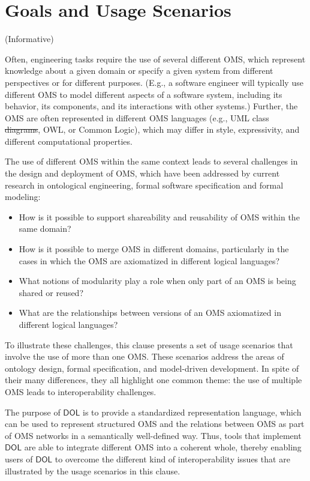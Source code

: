 \documentclass[10pt,fleqn,final]{scrreprt}
\newcommand*{\DOL}{\ensuremath{\mathsf{DOL}}\xspace}
\newcommand{\informative}[0]{{\begin{center}{\Large{(Informative})}\end{center}} \bigskip}
\newcommand{\clauseI}[1]{\chapter{#1} \informative }
\newenvironment{definitions}[0]{\medskip }{}
\providecommand{\DIFadd}[1]{{\protect\color{blue}\uwave{#1}}} %
\providecommand{\DIFdel}[1]{{\protect\color{red}\sout{#1}}}                      %
\providecommand{\DIFaddbegin}{} %
\providecommand{\DIFaddend}{} %
\providecommand{\DIFdelbegin}{} %
\providecommand{\DIFdelend}{} %
\begin{document}
\begin{definitions}

\clauseI{Goals and Usage Scenarios} \label{c:goal}


Often, engineering tasks require the use of several different OMS, which represent knowledge about 
a given domain or specify a given system from different perspectives or for different purposes.
(E.g., a software engineer will typically use different OMS to model different aspects of a software
 system,  including its behavior, its components, and its interactions with other systems.)  Further, the OMS are often represented in different OMS languages (e.g., UML class \DIFdelbegin \DIFdel{diagrams}\DIFdelend \DIFaddbegin \DIFadd{models}\DIFaddend , OWL, or Common Logic), which may differ in style, expressivity, and different computational properties. 

The use of different OMS within the same context leads to  several 
challenges in the design and deployment of OMS, which have been addressed by current research in 
ontological engineering, formal software specification and formal modeling:
\begin{itemize}
\item How is it possible to support shareability and reusability of OMS within the same domain?
\item How is it possible to merge OMS in different domains, particularly in the cases 
in which the OMS are axiomatized in different logical languages?
\item What notions of modularity play a role when only part of an OMS is being shared or reused?
\item What are the relationships between versions of an OMS axiomatized in different logical languages?
\end{itemize}


To illustrate these challenges, this clause presents a set of usage scenarios that involve the use of more than one OMS. These scenarios address the areas of ontology design, formal specification, and model-driven development. In spite of their many differences, they  all highlight one common theme:  
 the use of multiple OMS leads to interoperability challenges. 


The purpose of \DOL is to provide  a
standardized representation language, which can be used to represent structured OMS and the relations 
between OMS as part of OMS networks in a semantically well-defined way. Thus, tools that implement \DOL are able to integrate different OMS into a coherent whole, thereby enabling users of \DOL to overcome the different kind of interoperability issues that are illustrated by the usage scenarios in this clause.  



\end{definitions}
\end{document}
